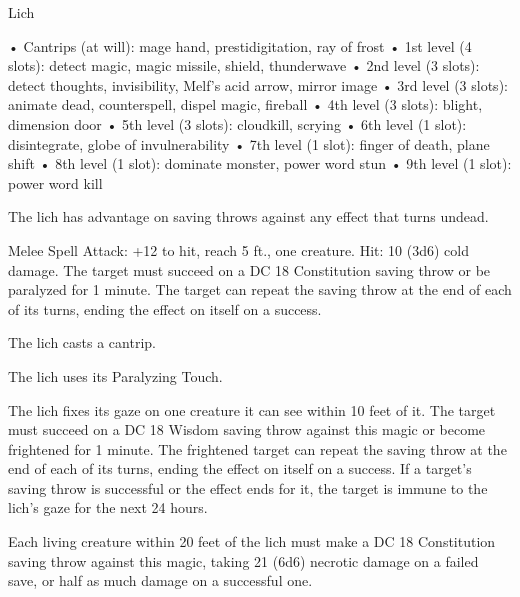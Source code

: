 \begin{monsterbox}{Lich}
\begin{monsteraction}[Spellcasting]
• Cantrips (at will): mage hand, prestidigitation, ray of frost
• 1st level (4 slots): detect magic, magic missile, shield, thunderwave
• 2nd level (3 slots): detect thoughts, invisibility, Melf's acid arrow, mirror image
• 3rd level (3 slots): animate dead, counterspell, dispel magic, fireball
• 4th level (3 slots): blight, dimension door
• 5th level (3 slots): cloudkill, scrying
• 6th level (1 slot): disintegrate, globe of invulnerability
• 7th level (1 slot): finger of death, plane shift
• 8th level (1 slot): dominate monster, power word stun
• 9th level (1 slot): power word kill
\end{monsteraction}
\begin{monsteraction}
The lich has advantage on saving throws against any effect that turns undead.
\end{monsteraction}
\begin{monsteraction}
Melee Spell Attack: +12 to hit, reach 5 ft., one creature. Hit: 10 (3d6) cold damage. The target must succeed on a DC 18 Constitution saving throw or be paralyzed for 1 minute. The target can repeat the saving throw at the end of each of its turns, ending the effect on itself on a success.
\end{monsteraction}
\begin{monsteraction}[Cantrip]
The lich casts a cantrip.
\end{monsteraction}
\begin{monsteraction}
The lich uses its Paralyzing Touch.
\end{monsteraction}
\begin{monsteraction}
The lich fixes its gaze on one creature it can see within 10 feet of it. The target must succeed on a DC 18 Wisdom saving throw against this magic or become frightened for 1 minute. The frightened target can repeat the saving throw at the end of each of its turns, ending the effect on itself on a success. If a target's saving throw is successful or the effect ends for it, the target is immune to the lich's gaze for the next 24 hours.
\end{monsteraction}
\begin{monsteraction}
Each living creature within 20 feet of the lich must make a DC 18 Constitution saving throw against this magic, taking 21 (6d6) necrotic damage on a failed save, or half as much damage on a successful one.
\end{monsteraction}
\end{monsterbox}